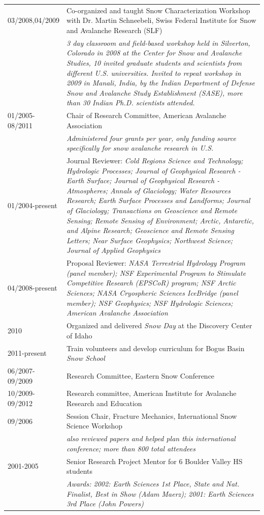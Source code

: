 \documentclass[11pt]{article}
\begin{document}
\begin{longtable}{p{1.2in}|p{5.7in}}
03/2008,04/2009 & Co-organized and taught Snow Characterization Workshop with Dr. Martin Schneebeli, Swiss Federal Institute for Snow and Avalanche Research (SLF) \\
& \textit{3 day classroom and field-based workshop held in Silverton, Colorado in 2008 at the Center for Snow and Avalanche Studies, 10 invited graduate students and scientists from different U.S. universities.  Invited to repeat workshop in 2009 in Manali, India, by the Indian Department of Defense Snow and Avalanche Study Establishment (SASE), more than 30 Indian Ph.D. scientists attended.} \\
01/2005-08/2011 & Chair of Research Committee, American Avalanche Association \\
& \textit{Administered four grants per year, only funding source specifically for snow avalanche research in U.S.} \\

01/2004-present & Journal Reviewer: \textit{Cold Regions Science and Technology; 
Hydrologic Processes; Journal of Geophysical Research - Earth Surface; Journal of 
Geophysical Research - Atmospheres; Annals of Glaciology; Water Resources Research; 
Earth Surface Processes and Landforms; Journal of Glaciology; Transactions on Geoscience
and Remote Sensing; Remote Sensing of Environment; Arctic, Antarctic, and Alpine Research;
Geoscience and Remote Sensing Letters; Near Surface Geophysics; Northwest Science; Journal of Applied Geophysics} \\

04/2008-present & Proposal Reviewer: \textit{NASA Terrestrial Hydrology Program (panel member); 
NSF Experimental Program to Stimulate Competitive Research (EPSCoR) program; NSF Arctic Sciences; NASA Cryospheric Sciences IceBridge (panel member); NSF Geophysics; NSF Hydrologic Sciences; American Avalanche Association} \\

2010 & Organized and delivered \textit{Snow Day} at the Discovery Center of Idaho \\
2011-present & Train volunteers and develop curriculum for Bogus Basin \textit{Snow School} \\
06/2007-09/2009 & Research Committee, Eastern Snow Conference \\
10/2009-09/2012 & Research committee, American Institute for Avalanche Research and Education \\
09/2006 & Session Chair, Fracture Mechanics, International Snow Science Workshop \\
& \textit{also reviewed papers and helped plan this international conference; 
more than 800 total attendees}  \\
2001-2005 & Senior Research Project Mentor for 6 Boulder Valley HS students \\
& \textit{Awards: 2002: Earth Sciences 1st Place, State and Nat. Finalist, Best in Show 
(Adam Maerz); 2001: Earth Sciences 3rd Place (John Powers)} \\
\end{longtable}
\endgroup
\end{document}
